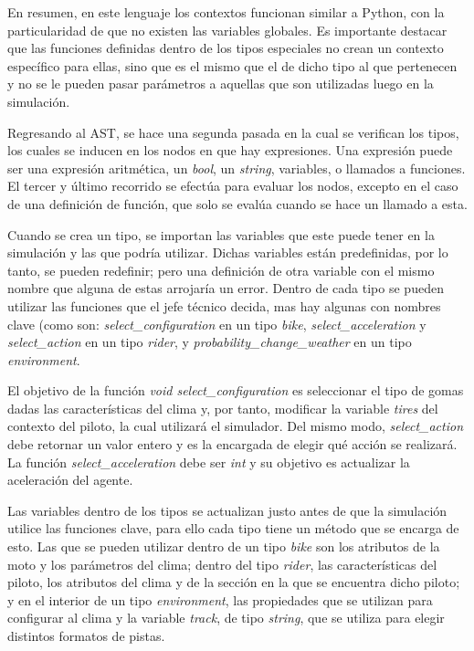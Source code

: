 \documentclass[12pt, letterpaper,spanish]{article}
\theoremstyle{definition}
\theoremstyle{remark}
\begin{document}
	En resumen, en este lenguaje los contextos funcionan similar a Python, con la particularidad de que no existen las variables globales. Es importante destacar que las funciones definidas dentro de los tipos especiales no crean un contexto específico para ellas, sino que es el mismo que el de dicho tipo al que pertenecen y no se le pueden pasar parámetros a aquellas que son utilizadas luego en la simulación.

       Regresando al AST, se hace una segunda pasada en la cual se verifican los tipos, los cuales se inducen en los nodos en que hay expresiones. Una expresión puede ser una expresión aritmética, un \emph{bool}, un \emph{string}, variables, o llamados a funciones. El tercer y último recorrido se efectúa para evaluar los nodos, excepto en el caso de una definición de función, que solo se evalúa cuando se hace un llamado a esta.

        Cuando se crea un tipo, se importan las variables que este puede tener en la simulación y las que podría utilizar. Dichas variables están predefinidas, por lo tanto, se pueden redefinir; pero una definición de otra variable con el mismo nombre que alguna de estas arrojaría un error. Dentro de cada tipo se pueden utilizar las funciones que el jefe técnico decida, mas hay algunas con nombres clave (como son: \emph{select\_configuration} en un tipo \emph{bike}, \emph{select\_acceleration} y \emph{select\_action} en un tipo \emph{rider}, y \emph{probability\_change\_weather} en un tipo \emph{environment}. 

	El objetivo de la función \emph{void select\_configuration} es seleccionar el tipo de gomas dadas las características del clima y, por tanto, modificar la variable \emph{tires} del contexto del piloto, la cual utilizará el simulador. Del mismo modo, \emph{select\_action} debe retornar un valor entero y es la encargada de elegir qué acción se realizará. La función \emph{select\_acceleration} debe ser \emph{int} y su objetivo es actualizar la aceleración del agente.

	Las variables dentro de los tipos se actualizan justo antes de que la simulación utilice las funciones clave, para ello cada tipo tiene un método que se encarga de esto. Las que se pueden utilizar dentro de un tipo \emph{bike} son los atributos de la moto y los parámetros del clima; dentro del tipo \emph{rider}, las características del piloto, los atributos del clima y de la sección en la que se encuentra dicho piloto; y en el interior de un tipo \emph{environment}, las propiedades que se utilizan para configurar al clima y la variable \emph{track}, de tipo \emph{string}, que se utiliza para elegir distintos formatos de pistas.
\end{document}
